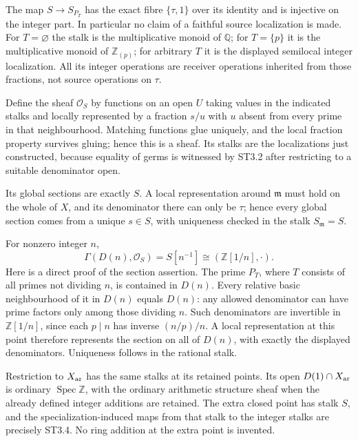 The map \(S\to S_{P_T}\) has the exact fibre \(\{\tau,1\}\) over its
identity and is injective on the integer part. In particular no claim of
a faithful source localization is made. For \(T=\varnothing\) the stalk
is the multiplicative monoid of \(\mathbb Q\); for \(T=\{p\}\) it is the
multiplicative monoid of \(\mathbb Z_{(p)}\); for arbitrary \(T\) it is
the displayed semilocal integer localization. All its integer operations
are receiver operations inherited from those fractions, not source
operations on \(\tau\).

Define the sheaf \(\mathcal O_S\) by functions on an open \(U\) taking
values in the indicated stalks and locally represented by a fraction
\(s/u\) with \(u\) absent from every prime in that neighbourhood.
Matching functions glue uniquely, and the local fraction property
survives gluing; hence this is a sheaf. Its stalks are the localizations
just constructed, because equality of germs is witnessed by ST3.2 after
restricting to a suitable denominator open.

Its global sections are exactly \(S\). A local representation around
\(\mathfrak m\) must hold on the whole of \(X\), and its denominator
there can only be \(\tau\); hence every global section comes from a
unique \(s\in S\), with uniqueness checked in the stalk
\(S_{\mathfrak m}=S\).

For nonzero integer \(n\), \[
 \Gamma(D(n),\mathcal O_S)=S[n^{-1}]
 \cong(\mathbb Z[1/n],\cdot).
\tag{ST3.5}
\] Here is a direct proof of the section assertion. The prime \(P_T\),
where \(T\) consists of all primes not dividing \(n\), is contained in
\(D(n)\). Every relative basic neighbourhood of it in \(D(n)\) equals
\(D(n)\): any allowed denominator can have prime factors only among
those dividing \(n\). Such denominators are invertible in
\(\mathbb Z[1/n]\), since each \(p\mid n\) has inverse \((n/p)/n\). A
local representation at this point therefore represents the section on
all of \(D(n)\), with exactly the displayed denominators. Uniqueness
follows in the rational stalk.

Restriction to \(X_{\rm ar}\) has the same stalks at its retained
points. Its open \(D(1)\cap X_{\rm ar}\) is ordinary
\(\operatorname{Spec}\mathbb Z\), with the ordinary arithmetic structure
sheaf when the already defined integer additions are retained. The extra
closed point has stalk \(S\), and the specialization-induced maps from
that stalk to the integer stalks are precisely ST3.4. No ring addition
at the extra point is invented.

